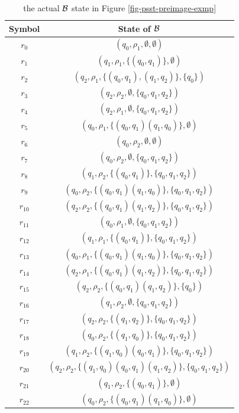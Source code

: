 \begin{table}[t]
\centering
\caption{the actual $\mathcal{B}$ state in Figure 
\label{table:psst-preimage}
\ref{fig-psst-preimage-exmp}}
\begin{tabular}{|c|c|}
    \hline
    Symbol & State of $\mathcal{B}$\\
    \hline
    $r_0$ & $(q_0, \rho_1, \emptyset, \emptyset)$\\
    \hline
    $r_1$ & $(q_1, \rho_1, \{ (q_0, q_1) \}, \emptyset)$\\
    \hline
    $r_2$ & $(q_2, \rho_1, \{ (q_0, q_1), (q_1, q_2) \}, \{ q_0 \})$\\
    \hline
    $r_3$ & $(q_2, \rho_2, \emptyset, \{ q_0, q_1, q_2 \})$\\
    \hline
    $r_4$ & $(q_2, \rho_1, \emptyset, \{ q_0, q_1, q_2 \})$\\
    \hline
    $r_5$ & $(q_0, \rho_1, \{ (q_0, q_1) (q_1, q_0) \}, \emptyset)$\\
    \hline
    $r_6$ & $(q_0, \rho_2, \emptyset, \emptyset)$\\
    \hline
    $r_7$ & $(q_0, \rho_2, \emptyset, \{ q_0, q_1, q_2 \})$\\
    \hline
    $r_8$ & $(q_1, \rho_2, \{ (q_0, q_1) \}, \{ q_0, q_1, q_2 \})$\\
    \hline
    $r_9$ & $(q_0, \rho_2, \{ (q_0, q_1) (q_1, q_0) \}, \{ q_0, q_1, q_2 \})$\\
    \hline
    $r_{10}$ & $(q_2, \rho_2, \{ (q_0, q_1) (q_1, q_2) \}, \{ q_0, q_1, q_2 \})$\\
    \hline
    $r_{11}$ & $(q_0, \rho_1, \emptyset, \{ q_0, q_1, q_2 \})$\\
    \hline
    $r_{12}$ & $(q_1, \rho_1, \{ (q_0, q_1) \}, \{ q_0, q_1, q_2 \})$\\
    \hline
    $r_{13}$ & $(q_0, \rho_1, \{ (q_0, q_1) (q_1, q_0) \}, \{ q_0, q_1, q_2 \})$\\
    \hline
    $r_{14}$ & $(q_2, \rho_1, \{ (q_0, q_1) (q_1, q_2) \}, \{ q_0, q_1, q_2 \})$\\
    \hline
    $r_{15}$ & $(q_2, \rho_2, \{ (q_0, q_1) (q_1, q_2) \}, \{ q_0 \})$\\
    \hline
    $r_{16}$ & $(q_1, \rho_2, \emptyset, \{ q_0, q_1, q_2 \})$\\
    \hline
    $r_{17}$ & $(q_2, \rho_2, \{ (q_1, q_2) \}, \{ q_0, q_1, q_2 \})$\\
    \hline
    $r_{18}$ & $(q_0, \rho_2, \{ (q_1, q_0) \}, \{ q_0, q_1, q_2 \})$\\
    \hline
    $r_{19}$ & $(q_1, \rho_2, \{ (q_1, q_0) (q_0, q_1) \}, \{ q_0, q_1, q_2 \})$\\
    \hline
    $r_{20}$ & $(q_2, \rho_2, \{ (q_1, q_0) (q_0, q_1) (q_1, q_2) \}, \{ q_0, q_1, q_2 \})$\\
    \hline
    $r_{21}$ & $(q_1, \rho_2, \{ (q_0, q_1) \}, \emptyset)$\\
    \hline
    $r_{22}$ & $(q_0, \rho_2, \{ (q_0, q_1) (q_1, q_0) \}, \emptyset)$\\
    \hline
\end{tabular}

\end{table}





